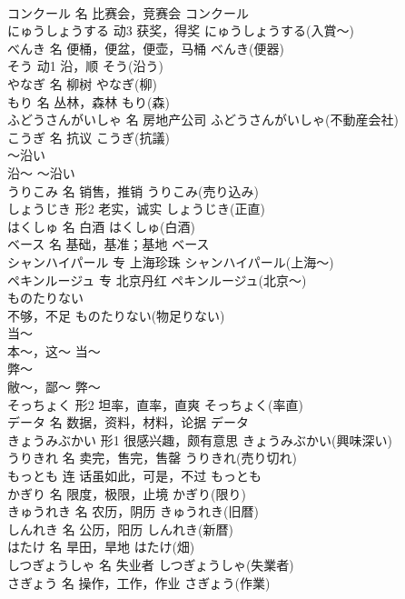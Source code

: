 \documentclass[8pt]{extreport}
\begin{document}
\begin{CJK}{UTF8}{min}
\\	コンクール	名	比赛会，竞赛会	コンクール	
\\	にゅうしょうする	动3	获奖，得奖	にゅうしょうする(入賞～)	
\\	べんき	名	便桶，便盆，便壶，马桶	べんき(便器)	
\\	そう	动1	沿，顺	そう(沿う)	
\\	やなぎ	名	柳树	やなぎ(柳)	
\\	もり	名	丛林，森林	もり(森)	
\\	ふどうさんがいしゃ	名	房地产公司	ふどうさんがいしゃ(不動産会社)	
\\	こうぎ	名	抗议	こうぎ(抗議)	
\\	～沿い	
\\	沿～	～沿い	
\\	うりこみ	名	销售，推销	うりこみ(売り込み)	
\\	しょうじき	形2	老实，诚实	しょうじき(正直)	
\\	はくしゅ	名	白酒	はくしゅ(白酒)	
\\	ベース	名	基础，基准；基地	ベース	
\\	シャンハイパール	专	上海珍珠	シャンハイパール(上海～)	
\\	ペキンルージュ	专	北京丹红	ペキンルージュ(北京～)	
\\	ものたりない	
\\	不够，不足	ものたりない(物足りない)	
\\	当～	
\\	本～，这～	当～	
\\	弊～	
\\	敝～，鄙～	弊～	
\\	そっちょく	形2	坦率，直率，直爽	そっちょく(率直)	
\\	データ	名	数据，资料，材料，论据	データ	
\\	きょうみぶかい	形1	很感兴趣，颇有意思	きょうみぶかい(興味深い)	
\\	うりきれ	名	卖完，售完，售罄	うりきれ(売り切れ)	
\\	もっとも	连	话虽如此，可是，不过	もっとも	
\\	かぎり	名	限度，极限，止境	かぎり(限り)	
\\	きゅうれき	名	农历，阴历	きゅうれき(旧暦)	
\\	しんれき	名	公历，阳历	しんれき(新暦)	
\\	はたけ	名	旱田，旱地	はたけ(畑)	
\\	しつぎょうしゃ	名	失业者	しつぎょうしゃ(失業者)	
\\	さぎょう	名	操作，工作，作业	さぎょう(作業)	

\end{CJK}
\end{document}
